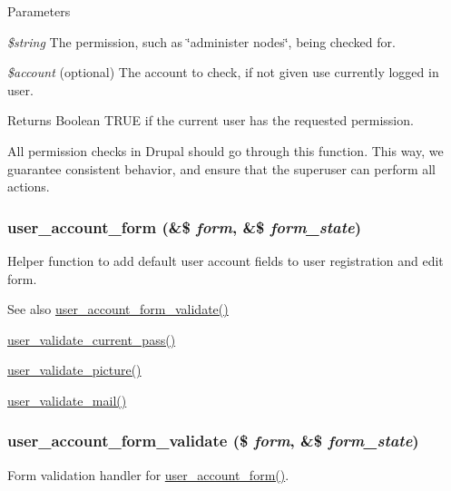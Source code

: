 \begin{DoxyParams}{Parameters}
\item[{\em \$string}]The permission, such as \char`\"{}administer nodes\char`\"{}, being checked for. \item[{\em \$account}](optional) The account to check, if not given use currently logged in user.\end{DoxyParams}
\begin{DoxyReturn}{Returns}
Boolean TRUE if the current user has the requested permission.
\end{DoxyReturn}
All permission checks in Drupal should go through this function. This way, we guarantee consistent behavior, and ensure that the superuser can perform all actions. \hypertarget{user_8module_ab51965add9fd8ee2915e65d39213d05c}{
\subsubsection[{user\_\-account\_\-form}]{\setlength{\rightskip}{0pt plus 5cm}user\_\-account\_\-form (\&\$ {\em form}, \/  \&\$ {\em form\_\-state})}}
\label{user_8module_ab51965add9fd8ee2915e65d39213d05c}
Helper function to add default user account fields to user registration and edit form.

\begin{DoxySeeAlso}{See also}
\hyperlink{user_8module_a168c461ed4da4e6a48458e68e7a85042}{user\_\-account\_\-form\_\-validate()} 

\hyperlink{user_8module_a129d5503ac6de8cdf01d11b18e2c7298}{user\_\-validate\_\-current\_\-pass()} 

\hyperlink{user_8module_aa8b7bc791c72d8484dd8462440d41b3a}{user\_\-validate\_\-picture()} 

\hyperlink{user_8module_abe55c980b2faeab65d0a9942f99916dd}{user\_\-validate\_\-mail()} 
\end{DoxySeeAlso}
\hypertarget{user_8module_a168c461ed4da4e6a48458e68e7a85042}{
\subsubsection[{user\_\-account\_\-form\_\-validate}]{\setlength{\rightskip}{0pt plus 5cm}user\_\-account\_\-form\_\-validate (\$ {\em form}, \/  \&\$ {\em form\_\-state})}}
\label{user_8module_a168c461ed4da4e6a48458e68e7a85042}
Form validation handler for \hyperlink{user_8module_ab51965add9fd8ee2915e65d39213d05c}{user\_\-account\_\-form()}.

